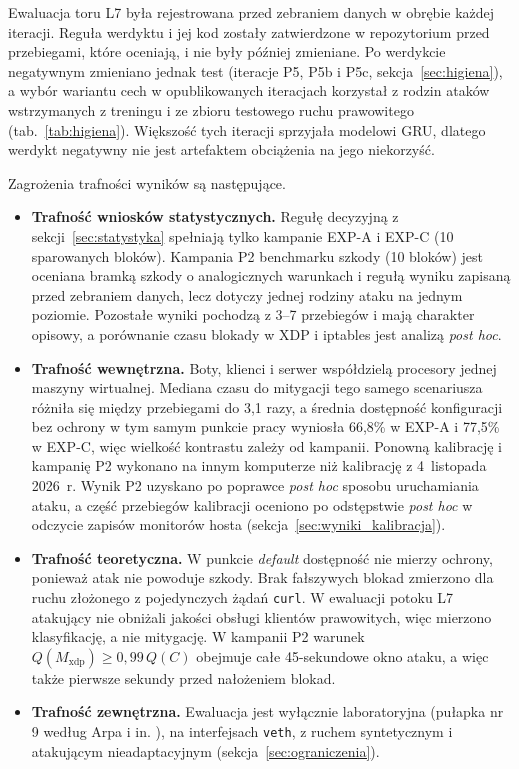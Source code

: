 \documentclass[a4paper,12pt]{article}
\begin{document}
Ewaluacja toru L7 była rejestrowana przed zebraniem danych w obrębie każdej iteracji. Reguła werdyktu i jej kod zostały zatwierdzone w repozytorium przed przebiegami, które oceniają, i nie były później zmieniane. Po werdykcie negatywnym zmieniano jednak test (iteracje P5, P5b i P5c, sekcja~\ref{sec:higiena}), a wybór wariantu cech w opublikowanych iteracjach korzystał z rodzin ataków wstrzymanych z treningu i ze zbioru testowego ruchu prawowitego (tab.~\ref{tab:higiena}). Większość tych iteracji sprzyjała modelowi GRU, dlatego werdykt negatywny nie jest artefaktem obciążenia na jego niekorzyść.

Zagrożenia trafności wyników są następujące.
\begin{itemize}
    \item \textbf{Trafność wniosków statystycznych.} Regułę decyzyjną z sekcji~\ref{sec:statystyka} spełniają tylko kampanie EXP-A i EXP-C (10 sparowanych bloków). Kampania P2 benchmarku szkody (10 bloków) jest oceniana bramką szkody o analogicznych warunkach i regułą wyniku zapisaną przed zebraniem danych, lecz dotyczy jednej rodziny ataku na jednym poziomie. Pozostałe wyniki pochodzą z 3--7 przebiegów i mają charakter opisowy, a porównanie czasu blokady w XDP i iptables jest analizą \textit{post hoc}.
    \item \textbf{Trafność wewnętrzna.} Boty, klienci i serwer współdzielą procesory jednej maszyny wirtualnej. Mediana czasu do mitygacji tego samego scenariusza różniła się między przebiegami do 3,1 razy, a średnia dostępność konfiguracji bez ochrony w tym samym punkcie pracy wyniosła 66,8\% w EXP-A i 77,5\% w EXP-C, więc wielkość kontrastu zależy od kampanii. Ponowną kalibrację i kampanię P2 wykonano na innym komputerze niż kalibrację z 4~listopada 2026~r. Wynik P2 uzyskano po poprawce \textit{post hoc} sposobu uruchamiania ataku, a część przebiegów kalibracji oceniono po odstępstwie \textit{post hoc} w odczycie zapisów monitorów hosta (sekcja~\ref{sec:wyniki_kalibracja}).
    \item \textbf{Trafność teoretyczna.} W punkcie \textit{default} dostępność nie mierzy ochrony, ponieważ atak nie powoduje szkody. Brak fałszywych blokad zmierzono dla ruchu złożonego z pojedynczych żądań \texttt{curl}. W ewaluacji potoku L7 atakujący nie obniżali jakości obsługi klientów prawowitych, więc mierzono klasyfikację, a nie mitygację. W kampanii P2 warunek $Q(M_{\mathrm{xdp}}) \geq 0{,}99\,Q(C)$ obejmuje całe 45-sekundowe okno ataku, a więc także pierwsze sekundy przed nałożeniem blokad.
    \item \textbf{Trafność zewnętrzna.} Ewaluacja jest wyłącznie laboratoryjna (pułapka nr 9 według Arpa i in. \cite{arp2022dos}), na interfejsach \texttt{veth}, z ruchem syntetycznym i atakującym nieadaptacyjnym (sekcja~\ref{sec:ograniczenia}).
\end{itemize}
\end{document}
